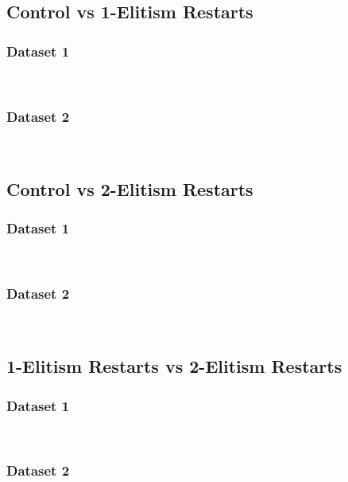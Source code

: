 \documentclass{article}
\begin{document}
\subsection{Control vs 1-Elitism Restarts}
\subsubsection{Dataset 1}
\begin{paragraph}
\\
\end{paragraph}
\subsubsection{Dataset 2}
\begin{paragraph}
\\
\end{paragraph}
\subsection{Control vs 2-Elitism Restarts}
\subsubsection{Dataset 1}
\begin{paragraph}
\\
\end{paragraph}
\subsubsection{Dataset 2}
\begin{paragraph}
\\
\end{paragraph}
\subsection{1-Elitism Restarts vs 2-Elitism Restarts}
\subsubsection{Dataset 1}
\begin{paragraph}
\\
\end{paragraph}
\subsubsection{Dataset 2}
\begin{paragraph}
\\
\end{paragraph}
\end{document}
